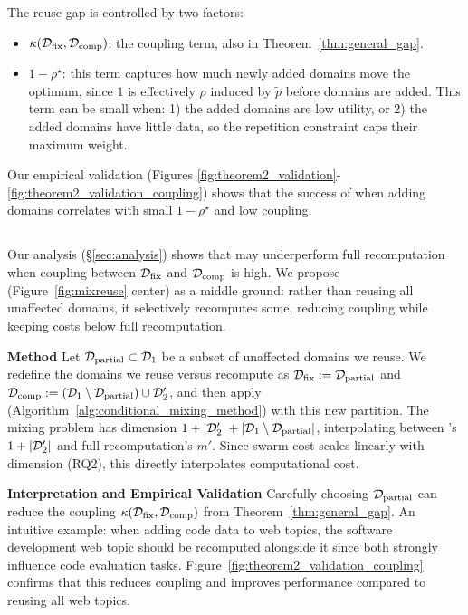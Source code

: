 The reuse gap is controlled by two factors:
\begin{itemize}[itemsep=0pt,topsep=2pt,leftmargin=12pt]
    \item $\kappa(\mathcal{D}_{\text{fix}}, \mathcal{D}_{\text{comp}})$: the coupling term, also in Theorem~\ref{thm:general_gap}.
    \item $1 - \rho^\star$: this term captures how much newly added domains move the optimum, since $1$ is effectively $\rho$ induced by $\tilde{p}$ before domains are added. This term can be small when: 1) the added domains are low utility, or 2) the added domains have little data, so the repetition constraint caps their maximum weight.
\end{itemize}    

Our empirical validation (Figures \ref{fig:theorem2_validation}- \ref{fig:theorem2_validation_coupling}) shows that the success of \fullmixreuse when adding domains correlates with small $1-\rho^\star$ and low coupling.


\subsection{\partialmixreuse}
\label{sec:partial-reuse}

Our analysis (\S\ref{sec:analysis}) shows that \fullmixreuse may underperform full recomputation when coupling between $\mathcal{D}_{\text{fix}}$ and $\mathcal{D}_{\text{comp}}$ is high. We propose \partialmixreuse (Figure~\ref{fig:mixreuse} center) as a middle ground: rather than reusing all unaffected domains, it selectively recomputes some, reducing coupling while keeping costs below full recomputation.


\textbf{Method} Let $\mathcal{D}_{\text{partial}} \subset \mathcal{D}_1$ be a subset of unaffected domains we reuse. We redefine the domains we reuse versus recompute as $\mathcal{D}_{\text{fix}} := \mathcal{D}_{\text{partial}}$ and $\mathcal{D}_{\text{comp}} := (\mathcal{D}_1 \setminus \mathcal{D}_{\text{partial}}) \cup \mathcal{D}_2'$, and then apply \fullmixreuse (Algorithm~\ref{alg:conditional_mixing_method}) with this new partition. The mixing problem has dimension $1 + |\mathcal{D}_2'| + |\mathcal{D}_1 \setminus \mathcal{D}_{\text{partial}}|$, interpolating between \fullmixreuse's $1 + |\mathcal{D}_2'|$ and full recomputation's $m'$. Since swarm cost scales linearly with dimension (RQ2), this directly interpolates computational cost.

\textbf{Interpretation and Empirical Validation} Carefully choosing $\mathcal{D}_{\text{partial}}$ can reduce the coupling $\kappa(\mathcal{D}_{\text{fix}}, \mathcal{D}_{\text{comp}})$ from Theorem~\ref{thm:general_gap}. 
An intuitive example: when adding code data to web topics, the software development web topic should be recomputed alongside it since both strongly influence code evaluation tasks. Figure~\ref{fig:theorem2_validation_coupling} confirms that this reduces coupling and improves performance compared to reusing all web topics.
